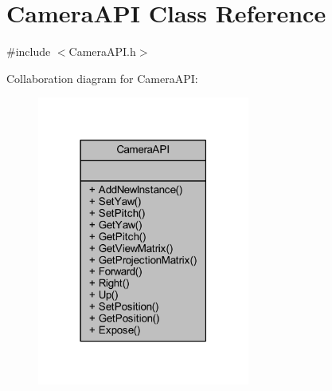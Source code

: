 \hypertarget{class_camera_a_p_i}{}\section{Camera\+A\+PI Class Reference}
\label{class_camera_a_p_i}


{\ttfamily \#include $<$Camera\+A\+P\+I.\+h$>$}



Collaboration diagram for Camera\+A\+PI\+:\nopagebreak
\begin{figure}[H]
\begin{center}
\leavevmode
\includegraphics[width=198pt]{class_camera_a_p_i__coll__graph}
\end{center}
\end{figure}
